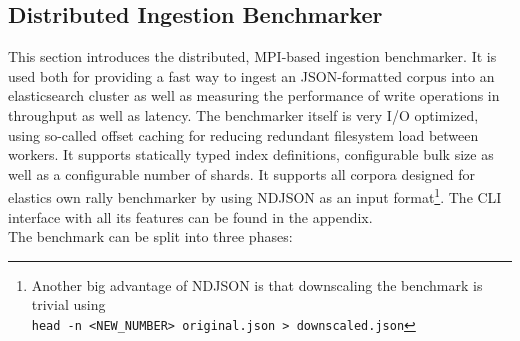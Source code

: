 \newpage

\subsection{Distributed Ingestion Benchmarker}
This section introduces the distributed, \ac{MPI}-based ingestion benchmarker. It is used both for providing a fast way to ingest an \ac{JSON}-formatted corpus into an elasticsearch cluster as well as measuring the performance of write operations in throughput as well as latency. The benchmarker itself is very I/O optimized, using so-called offset caching for reducing redundant filesystem load between workers. It supports statically typed index definitions, configurable bulk size as well as a configurable number of shards. It supports all corpora designed for elastics own rally benchmarker by using \ac{NDJSON} as an input format\footnote{Another big advantage of \ac{NDJSON} is that downscaling the benchmark is trivial using\\\texttt{head -n <NEW\_NUMBER> original.json > downscaled.json}}. The \ac{CLI} interface with all its features can be found in the appendix.\\

The benchmark can be split into three phases:

